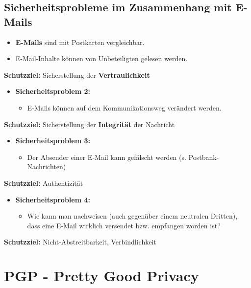 \documentclass[openany]{book}
\begin{document}
\subsection{Sicherheitsprobleme im Zusammenhang mit E-Mails}

\begin{itemize}
    \item \textbf{E-Mails} sind mit Postkarten vergleichbar.
    \item E-Mail-Inhalte können von Unbeteiligten gelesen werden.
\end{itemize}

\textbf{Schutzziel:} Sicherstellung der \textbf{Vertraulichkeit}

\begin{itemize}
    \item \textbf{Sicherheitsproblem 2:}
    \begin{itemize}
        \item E-Mails können auf dem Kommunikationsweg verändert werden.
    \end{itemize}
\end{itemize}

\textbf{Schutzziel:} Sicherstellung der \textbf{Integrität} der Nachricht

\begin{itemize}
    \item \textbf{Sicherheitsproblem 3:}
    \begin{itemize}
        \item Der Absender einer E-Mail kann gefälscht werden (s. Postbank-Nachrichten)
    \end{itemize}
\end{itemize}

\textbf{Schutzziel:} Authentizität

\begin{itemize}
    \item \textbf{Sicherheitsproblem 4:}
    \begin{itemize}
        \item Wie kann man nachweisen (auch gegenüber einem neutralen Dritten), dass eine E-Mail wirklich versendet bzw. empfangen worden ist?
    \end{itemize}
\end{itemize}

\textbf{Schutzziel:} Nicht-Abstreitbarkeit, Verbindlichkeit

\section{PGP - Pretty Good Privacy}
\end{document}

